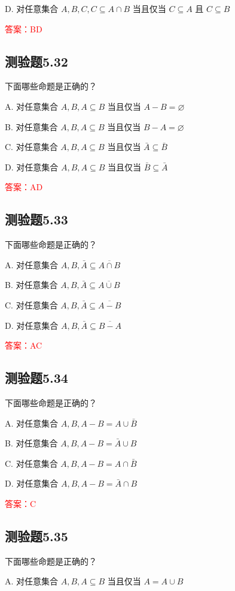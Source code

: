 \documentclass[UTF8, heading=true]{ctexart}
\begin{document}
D. 对任意集合 $A, B, C, C \subseteq A \cap B$ 当且仅当 $C \subseteq A$ 且 $C \subseteq B$

\textcolor{red}{答案：BD}

\subsection{测验题5.32}
下面哪些命题是正确的？

A. 
对任意集合 $A, B, A \subseteq B$ 当且仅当 $A-B=\varnothing$

B. 
对任意集合 $A, B, A \subseteq B$ 当且仅当 $B-A=\varnothing$

C. 
对任意集合 $A, B, A \subseteq B$ 当且仅当 $\bar{A} \subseteq \bar{B}$

D. 
对任意集合 $A, B, A \subseteq B$ 当且仅当 $\bar{B} \subseteq \bar{A}$

\textcolor{red}{答案：AD}

\subsection{测验题5.33}

下面哪些命题是正确的？

A. 对任意集合 $A, B, \bar{A} \subseteq \overline{A \cap B}$

B. 对任意集合 $A, B, \bar{A} \subseteq \overline{A \cup B}$

C. 对任意集合 $A, B, \bar{A} \subseteq \overline{A-B}$

D. 对任意集合 $A, B, \bar{A} \subseteq \overline{B-A}$

\textcolor{red}{答案：AC}

\subsection{测验题5.34}
下面哪些命题是正确的？

A. 
对任意集合 $A, B, A-B=A \cup \bar{B}$

B. 对任意集合 $A, B, A-B=\bar{A} \cup B$

C. 对任意集合 $A, B, A-B=A \cap \bar{B}$

D. 对任意集合 $A, B, A-B=\bar{A} \cap B$

\textcolor{red}{答案：C}


\subsection{测验题5.35}
下面哪些命题是正确的？

A. 对任意集合 $A, B, A \subseteq B$ 当且仅当 $A=A \cup B$
\end{document}
